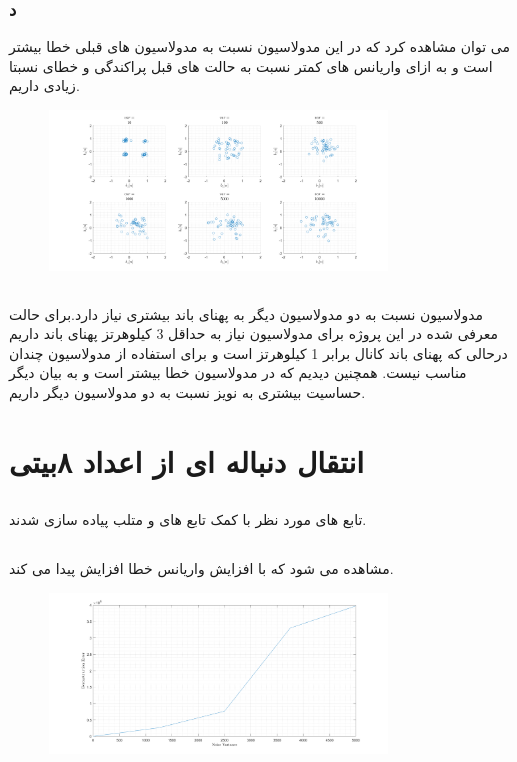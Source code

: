 \documentclass[a4paper]{article}
\begin{document}
	\subsubsection*{د}
	می توان مشاهده کرد که در این مدولاسیون نسبت به مدولاسیون های قبلی خطا بیشتر است و به ازای واریانس های کمتر نسبت به حالت های قبل پراکندگی و خطای نسبتا زیادی داریم.
	\begin{figure}[H]
		\includegraphics[width=0.8\textwidth]{comsys_fig50.png}\\ 
		\centering
	\end{figure}
	\subsection{}
	مدولاسیون  نسبت به دو مدولاسیون دیگر به پهنای باند بیشتری نیاز دارد.برای حالت معرفی شده در این پروژه برای مدولاسیون  نیاز به حداقل 3 کیلوهرتز پهنای باند داریم درحالی که پهنای باند کانال برابر 1 کیلوهرتز است و برای استفاده از مدولاسیون  چندان مناسب نیست.
	\newline
	همچنین دیدیم که در مدولاسیون  خطا بیشتر است و به بیان دیگر حساسیت بیشتری به نویز نسبت به دو مدولاسیون دیگر داریم.
	\section{انتقال دنباله ای از اعداد  ۸بیتی}
	\subsection{}
	تابع های مورد نظر با کمک تابع های  و  متلب پیاده سازی شدند.
	\subsection{}
	مشاهده می شود که با افزایش واریانس خطا افزایش پیدا می کند.
	\begin{figure}[H]
		\includegraphics[width=0.8\textwidth]{comsys_fig51.png}\\ 
		\centering
	\end{figure}
\end{document}
